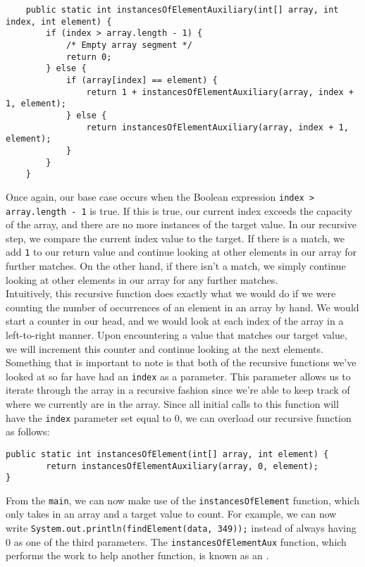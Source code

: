 \begin{lstlisting}
	public static int instancesOfElementAuxiliary(int[] array, int index, int element) {
		if (index > array.length - 1) {
			/* Empty array segment */
			return 0;
		} else {
			if (array[index] == element) {
				return 1 + instancesOfElementAuxiliary(array, index + 1, element);
			} else {
				return instancesOfElementAuxiliary(array, index + 1, element);
			}
		}
	}
\end{lstlisting}

Once again, our base case occurs when the Boolean expression \verb!index > array.length - 1! is true. If this is true, our current index exceeds the capacity of the array, and there are no more instances of the target value. In our recursive step, we compare the current index value to the target. If there is a match, we add \verb!1! to our return value and continue looking at other elements in our array for further matches. On the other hand, if there isn't a match, we simply continue looking at other elements in our array for any further matches. \\

\noindent Intuitively, this recursive function does exactly what we would do if we were counting the number of occurrences of an element in an array by hand. We would start a counter in our head, and we would look at each index of the array in a left-to-right manner. Upon encountering a value that matches our target value, we will increment this counter and continue looking at the next elements. \\


Something that is important to note is that both of the recursive functions we've looked at so far have had an \verb!index! as a parameter. This parameter allows us to iterate through the array in a recursive fashion since we're able to keep track of where we currently are in the array. Since all initial calls to this function will have the \verb!index! parameter set equal to $0$, we can overload our recursive function as follows:

\begin{lstlisting}
public static int instancesOfElement(int[] array, int element) {
		return instancesOfElementAuxiliary(array, 0, element);
}
\end{lstlisting}

From the \verb!main!, we can now make use of the \verb!instancesOfElement! function, which only takes in an array and a target value to count. For example, we can now write \verb!System.out.println(findElement(data, 349));! instead of always having $0$ as one of the third parameters. The \verb!instancesOfElementAux! function, which performs the work to help another function, is known as an .

